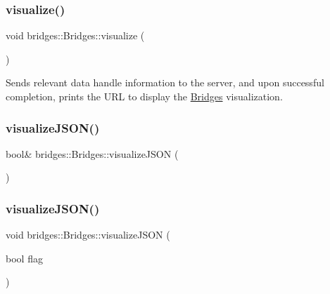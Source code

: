 \subsubsection{\texorpdfstring{visualize()}{visualize()}}
{\footnotesize\ttfamily void bridges\+::\+Bridges\+::visualize (\begin{DoxyParamCaption}{ }\end{DoxyParamCaption})}

Sends relevant data handle information to the server, and upon successful completion, prints the U\+RL to display the \hyperlink{namespacebridges_1_1_bridges}{Bridges} visualization. \hypertarget{namespacebridges_1_1_bridges_a692124feb006d58c277db36c2e9342c8}{}\label{namespacebridges_1_1_bridges_a692124feb006d58c277db36c2e9342c8} 
\subsubsection{\texorpdfstring{visualize\+J\+S\+O\+N()}{visualizeJSON()}\hspace{0.1cm}{\footnotesize\ttfamily [1/2]}}
{\footnotesize\ttfamily bool\& bridges\+::\+Bridges\+::visualize\+J\+S\+ON (\begin{DoxyParamCaption}{ }\end{DoxyParamCaption})}

\hypertarget{namespacebridges_1_1_bridges_abb0f749a6dbcd0a430504f66de1dbe64}{}\label{namespacebridges_1_1_bridges_abb0f749a6dbcd0a430504f66de1dbe64} 
\subsubsection{\texorpdfstring{visualize\+J\+S\+O\+N()}{visualizeJSON()}\hspace{0.1cm}{\footnotesize\ttfamily [2/2]}}
{\footnotesize\ttfamily void bridges\+::\+Bridges\+::visualize\+J\+S\+ON (\begin{DoxyParamCaption}\item[{bool}]{flag }\end{DoxyParamCaption})}

